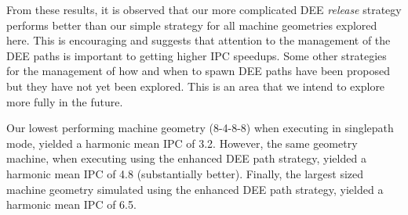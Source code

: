 \documentclass[10pt,dvips]{article}
\begin{document}
%
From these results, 
it is observed that our more complicated DEE \textit{release} strategy
performs better than our simple strategy for all machine
geometries explored here.
This is encouraging and suggests that attention to the
management of the DEE paths is important to getting
higher IPC speedups.
Some other strategies for the management of how and when to
spawn DEE paths have been proposed but they have not yet been
explored.  
This is an area that we intend to explore more
fully in the future.

Our lowest performing machine geometry (8-4-8-8) when executing
in singlepath mode, yielded a harmonic mean IPC of 3.2.
However, the same geometry machine, when executing using the
enhanced DEE path strategy, yielded a harmonic mean IPC of 4.8
(substantially better).  Finally, the largest sized machine geometry
simulated using the enhanced DEE path strategy, yielded a
harmonic mean IPC of 6.5.
%
%
\end{document}
